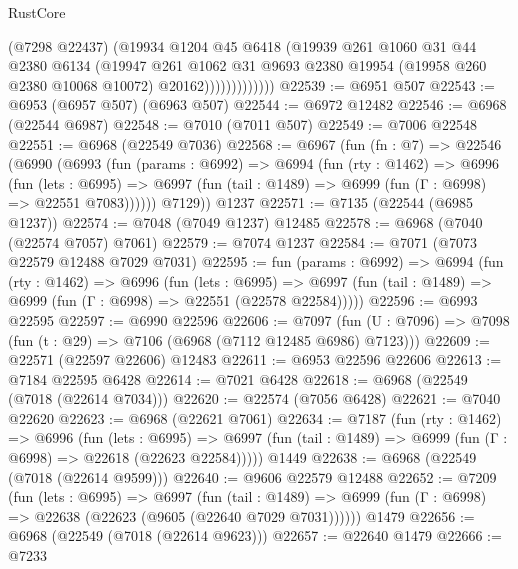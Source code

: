 \begin{lexlean}{RustCore}
\begin{coremodule}
                        (@7298 @22437)
                        (@19934
                          @1204
                          @45
                          @6418
                          (@19939
                            @261
                            @1060
                            @31
                            @44
                            @2380
                            @6134
                            (@19947
                              @261
                              @1062
                              @31
                              @9693
                              @2380
                              @19954
                              (@19958 @260 @2380 @10068 @10072)
                              @20162)))))))))))))
@22539 := @6951 @507
@22543 := @6953 (@6957 @507) (@6963 @507)
@22544 := @6972 @12482
@22546 := @6968 (@22544 @6987)
@22548 := @7010 (@7011 @507)
@22549 := @7006 @22548
@22551 := @6968 (@22549 @7036)
@22568 := @6967
    (fun (fn : @7) =>
    @22546
      (@6990
        (@6993
          (fun (params : @6992) =>
          @6994
            (fun (rty : @1462) =>
            @6996
              (fun (lets : @6995) =>
              @6997 (fun (tail : @1489) => @6999 (fun (Γ : @6998) => @22551 @7083))))))
        @7129))
    @1237
@22571 := @7135 (@22544 (@6985 @1237))
@22574 := @7048 (@7049 @1237) @12485
@22578 := @6968 (@7040 (@22574 @7057) @7061)
@22579 := @7074 @1237
@22584 := @7071 (@7073 @22579 @12488 @7029 @7031)
@22595 := fun (params : @6992) =>
  @6994
    (fun (rty : @1462) =>
    @6996
      (fun (lets : @6995) =>
      @6997 (fun (tail : @1489) => @6999 (fun (Γ : @6998) => @22551 (@22578 @22584)))))
@22596 := @6993 @22595
@22597 := @6990 @22596
@22606 := @7097
    (fun (U : @7096) => @7098 (fun (t : @29) => @7106 (@6968 (@7112 @12485 @6986) @7123)))
@22609 := @22571 (@22597 @22606) @12483
@22611 := @6953 @22596 @22606
@22613 := @7184 @22595 @6428
@22614 := @7021 @6428
@22618 := @6968 (@22549 (@7018 (@22614 @7034)))
@22620 := @22574 (@7056 @6428)
@22621 := @7040 @22620
@22623 := @6968 (@22621 @7061)
@22634 := @7187
    (fun (rty : @1462) =>
    @6996
      (fun (lets : @6995) =>
      @6997 (fun (tail : @1489) => @6999 (fun (Γ : @6998) => @22618 (@22623 @22584)))))
    @1449
@22638 := @6968 (@22549 (@7018 (@22614 @9599)))
@22640 := @9606 @22579 @12488
@22652 := @7209
    (fun (lets : @6995) =>
    @6997
      (fun (tail : @1489) =>
      @6999 (fun (Γ : @6998) => @22638 (@22623 (@9605 (@22640 @7029 @7031))))))
    @1479
@22656 := @6968 (@22549 (@7018 (@22614 @9623)))
@22657 := @22640 @1479
@22666 := @7233

\end{coremodule}
\end{lexlean}
